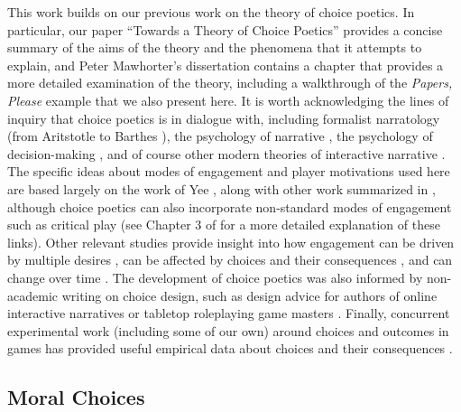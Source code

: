 \documentclass[arts,article,submit,moreauthors,pdftex,10pt,a4paper]{Definitions/mdpi}
\begin{document}
This work builds on our previous work on the theory of choice poetics.
%
In particular, our paper ``Towards a Theory of Choice Poetics'' \citep{mawhorter2014towards} provides a concise summary of the aims of the theory and the phenomena that it attempts to explain, and Peter Mawhorter's dissertation \citeyear{mawhorter2016artificial} contains a chapter that provides a more detailed examination of the theory, including a walkthrough of the \emph{Papers, Please} example that we also present here.
%
It is worth acknowledging the lines of inquiry that choice poetics is in dialogue with, including formalist narratology (from Aritstotle \citeyear{aristotle1917poetics} to Barthes \citeyear{barthes1975introduction}), the psychology of narrative \citep{tversky1981framing,green2000role,mar2008function,zunshine2006why}, the psychology of decision-making \citep{mellers1997decision,schwartz2002maximizing}, and of course other modern theories of interactive narrative \citep{aarseth1997cybertext,murray1997hamlet,ryan1991possible,tosca2000pragmatics,mateas2001preliminary,frasca2003ludologists,lindley2005story}.
%
The specific ideas about modes of engagement and player motivations used here are based largely on the work of Yee \citeyear{yee2006motivations}, along with other work summarized in \citep{hamari2014player}, although choice poetics can also incorporate non-standard modes of engagement such as critical play \citep{flanagan2009critical} (see Chapter 3 of \citep{mawhorter2016artificial} for a more detailed explanation of these links).
%
Other relevant studies provide insight into how engagement can be driven by multiple desires \citep{lindley2005story}, can be affected by choices and their consequences \citep{mallon2005stand}, and can change over time \citep{lange2014youre}.
%
The development of choice poetics was also informed by non-academic writing on choice design, such as design advice for authors of online interactive narratives \citep{choiceofgames2010rules} or tabletop roleplaying game masters \citep{laws2001robin}.
%
Finally, concurrent experimental work (including some of our own) around choices and outcomes in games has provided useful empirical data about choices and their consequences \citep{fendt2012achieving,cardonarivera2014foreseeing,mawhorter2015generating,iten2018choosing}.


\subsection{Moral Choices}
\end{document}
